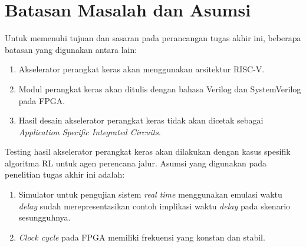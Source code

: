 \section{Batasan Masalah dan Asumsi}
\label{sec:batasan-masalah}

Untuk memenuhi tujuan dan sasaran pada perancangan tugas akhir ini, beberapa batasan yang digunakan antara lain:

\begin{enumerate}
	\item Akselerator perangkat keras akan menggunakan arsitektur RISC-V.
	\item Modul perangkat keras akan ditulis dengan bahasa Verilog dan SystemVerilog pada \acf{FPGA}.
	\item Hasil desain akselerator perangkat keras tidak akan dicetak sebagai \textit{Application Specific Integrated Circuits}.
\end{enumerate}

Testing hasil akselerator perangkat keras akan dilakukan dengan kasus spesifik algoritma \ac{RL} untuk agen perencana jalur. Asumsi yang digunakan pada penelitian tugas akhir ini adalah:

\begin{enumerate}
	\item Simulator untuk pengujian sistem \textit{real time} menggunakan emulasi waktu \textit{delay} sudah merepresentasikan contoh implikasi waktu \textit{delay} pada skenario sesungguhnya.
	\item \textit{Clock cycle} pada \ac{FPGA} memiliki frekuensi yang konstan dan stabil.
\end{enumerate}
